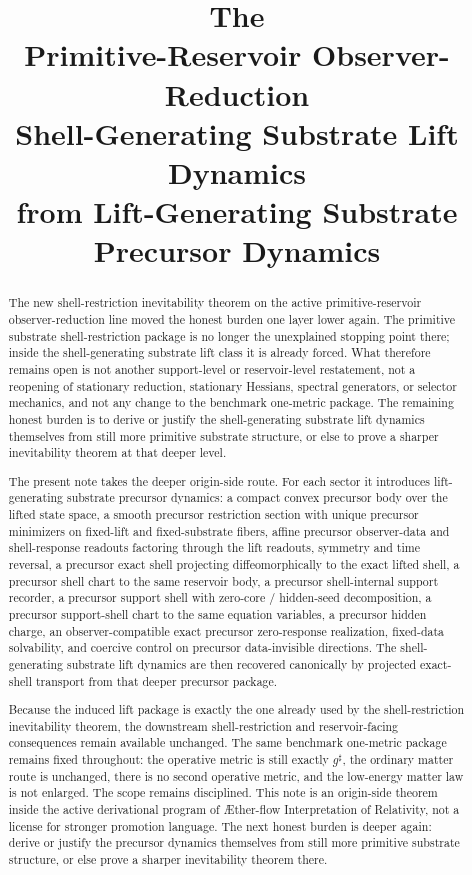 \documentclass[11pt]{article}
\title{\textbf{The \TheoryName{}}\\[0.4em]
\large Primitive-Reservoir Observer-Reduction\\
\large Shell-Generating Substrate Lift Dynamics\\
\large from Lift-Generating Substrate Precursor Dynamics}
\author{}
\date{}
\newcommand{\Aflow}{\AE{}ther-flow}
\newcommand{\TheoryName}{\Aflow{} Interpretation of Relativity}
\newcommand{\CompletedMetric}{g^{\sharp}}
\begin{document}
\maketitle

\begin{abstract}
The new shell-restriction inevitability theorem on the active primitive-reservoir observer-reduction line moved the honest burden one layer lower again. The primitive substrate shell-restriction package is no longer the unexplained stopping point there; inside the shell-generating substrate lift class it is already forced. What therefore remains open is not another support-level or reservoir-level restatement, not a reopening of stationary reduction, stationary Hessians, spectral generators, or selector mechanics, and not any change to the benchmark one-metric package. The remaining honest burden is to derive or justify the shell-generating substrate lift dynamics themselves from still more primitive substrate structure, or else to prove a sharper inevitability theorem at that deeper level.

The present note takes the deeper origin-side route. For each sector it introduces lift-generating substrate precursor dynamics: a compact convex precursor body over the lifted state space, a smooth precursor restriction section with unique precursor minimizers on fixed-lift and fixed-substrate fibers, affine precursor observer-data and shell-response readouts factoring through the lift readouts, symmetry and time reversal, a precursor exact shell projecting diffeomorphically to the exact lifted shell, a precursor shell chart to the same reservoir body, a precursor shell-internal support recorder, a precursor support shell with zero-core / hidden-seed decomposition, a precursor support-shell chart to the same equation variables, a precursor hidden charge, an observer-compatible exact precursor zero-response realization, fixed-data solvability, and coercive control on precursor data-invisible directions. The shell-generating substrate lift dynamics are then recovered canonically by projected exact-shell transport from that deeper precursor package.

Because the induced lift package is exactly the one already used by the shell-restriction inevitability theorem, the downstream shell-restriction and reservoir-facing consequences remain available unchanged. The same benchmark one-metric package remains fixed throughout: the operative metric is still exactly \(\CompletedMetric\), the ordinary matter route is unchanged, there is no second operative metric, and the low-energy matter law is not enlarged. The scope remains disciplined. This note is an origin-side theorem inside the active derivational program of \TheoryName{}, not a license for stronger promotion language. The next honest burden is deeper again: derive or justify the precursor dynamics themselves from still more primitive substrate structure, or else prove a sharper inevitability theorem there.
\end{abstract}
\end{document}
